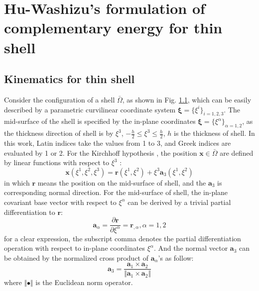 \section{Hu-Washizu's formulation of complementary energy for thin shell}
\subsection{Kinematics for thin shell}
Consider the configuration of a shell $\bar \Omega$, as shown in Fig. \ref{}, which can be easily described by a parametric curvilinear coordinate system $\boldsymbol \xi = \{\xi^i\}_{i=1,2,3}$. The mid-surface of the shell is specified by the in-plane coordinates $\boldsymbol \xi = \{\xi^\alpha\}_{\alpha=1,2}$, as the thickness direction of shell is by $\xi^3$, $-\frac{h}{2} \le \xi^3 \le \frac{h}{2}$, $h$ is the thickness of shell. In this work, Latin indices take the values from 1 to 3, and Greek indices are evaluated by 1 or 2. For the Kirchhoff hypothesis \cite{krysl1996}, the position $\boldsymbol x\in \bar \Omega$ are defined by linear functions with respect to $\xi^3$ :
\begin{equation}\label{x}
\boldsymbol x(\xi^1, \xi^2, \xi^3) = \boldsymbol r(\xi^1,\xi^2) + \xi^3 \boldsymbol a_3(\xi^1,\xi^2)
\end{equation}
in which $\boldsymbol r$ means the position on the mid-surface of shell, and the $\boldsymbol a_3$ is corresponding normal direction. For the mid-surface of shell, the in-plane covariant base vector with respect to $\xi^\alpha$ can be derived by a trivial partial differentiation to $\boldsymbol r$:
\begin{equation}
\boldsymbol a_\alpha = \frac{\partial \boldsymbol r}{\partial \xi^\alpha} = \boldsymbol r_{,\alpha}, \alpha  = 1,2
\end{equation}
for a clear expression, the subscript comma denotes the partial differentiation operation with respect to in-plane coordinates $\xi^\alpha$. And the normal vector $\boldsymbol a_3$ can be obtained by the normalized cross product of $\boldsymbol a_{\alpha}$'s as follow:
\begin{equation}
\boldsymbol a_3 = \frac{\boldsymbol a_1 \times \boldsymbol a_2}{\Vert \boldsymbol a_1 \times \boldsymbol a_2 \Vert}
\end{equation}
where $\Vert \bullet \Vert$ is the Euclidean norm operator.

